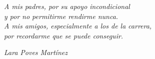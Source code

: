 \cleardoublepage


\

\ %

\

\

\ %

\

\

\

\

\

\

\

\

\

\

\

\



\begin{flushright}
    \vspace{\fill} %
    \emph{A mis padres, por su apoyo incondicional\\
    y por no permitirme rendirme nunca.\\[0.5cm]
    A mis amigos, especialmente a los de la carrera,\\
    por recordarme que se puede conseguir.}
    \par
    \vspace{0.5cm}
    \emph{Lara Poves Martínez}
\end{flushright}

\thispagestyle{empty}


